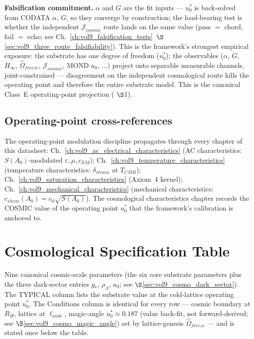 \textbf{Falsification commitment.} $\alpha$ and $G$ are the fit inputs --- $u_0^*$ is back-solved from CODATA $\alpha$, $G$, so they converge by construction; the load-bearing test is whether the independent $\mathcal{J}_{cosmic}$ route lands on the same value (pass $=$ chord, fail $=$ echo; see Ch.~\ref{ch:vol9_falsification_tests}~$\S$\ref{sec:vol9_three_route_falsifiability}). This is the framework's strongest empirical exposure: the substrate has one degree of freedom ($u_0^*$); the observables ($\alpha$, $G$, $H_\infty$, $\hat{\Omega}_{freeze}$, $\mathcal{J}_{cosmic}$, MOND $a_0$, $\ldots$) project onto separable measurable channels, joint-constrained --- disagreement on the independent cosmological route kills the operating point and therefore the entire substrate model. This is the canonical Class~E operating-point projection ( $\S$1).

\subsection{Operating-point cross-references}

The operating-point modulation discipline propagates through every chapter of this datasheet: Ch.~\ref{ch:vol9_ac_electrical_characteristics} (AC characteristics: $S(A_0)$-modulated $\varepsilon, \mu, c_{EM}$); Ch.~\ref{ch:vol9_temperature_characteristics} (temperature characteristics: $\delta_{strain}$ at $T_{CMB}$); Ch.~\ref{ch:vol9_saturation_characteristics} (Axiom~4 kernel); Ch.~\ref{ch:vol9_mechanical_characteristics} (mechanical characteristics: $c_{shear}(A_0) = c_0\sqrt{S(A_0)}$). The cosmological characteristics chapter records the COSMIC value of the operating point $u_0^*$ that the framework's calibration is anchored to.

\section{Cosmological Specification Table}
\label{sec:vol9_cosmo_spec_table}

Nine canonical cosmic-scale parameters (the six core substrate parameters plus the three dark-sector entries $g_*$, $\rho_\Lambda$, $a_0$; see $\S$\ref{sec:vol9_cosmo_dark_sector}). The TYPICAL column lists the substrate value at the cold-lattice operating point $u_0^*$. The Conditions column is identical for every row --- cosmic boundary at $R_H$, lattice at $\ell_{node}$, magic-angle $u_0^* \approx 0.187$ (value back-fit, not forward-derived; see $\S$\ref{sec:vol9_cosmo_magic_angle}) set by lattice-genesis $\hat{\Omega}_{freeze}$ --- and is stated once below the table.

